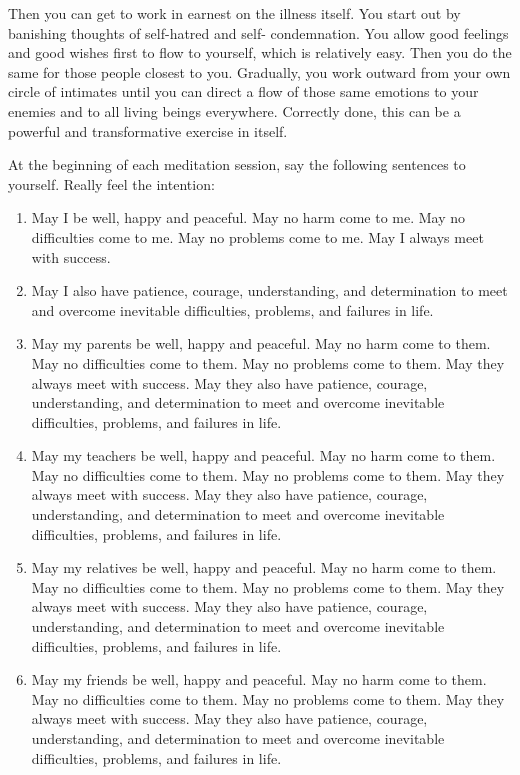 Then you can get to work in earnest on the illness itself.  You start out by
banishing thoughts of self-hatred and self- condemnation. You allow good
feelings and good wishes first to flow to yourself, which is relatively easy.
Then you do the same for those people closest to you. Gradually, you work
outward from your own circle of intimates until you can direct a flow of those
same emotions to your enemies and to all living beings everywhere. Correctly
done, this can be a powerful and transformative exercise in itself.

At the beginning of each meditation session, say the following sentences to
yourself. Really feel the intention: 

\begin{enumerate}
\item May I be well, happy and peaceful. May
no harm come to me. May no difficulties come to me. May no problems come to me.
May I always meet with success.

\item May I also have patience, courage, understanding, and determination to meet
and overcome inevitable difficulties, problems, and failures in life.

\item May my parents be well, happy and peaceful. May no harm come to them. May
no difficulties come to them. May no problems come to them. May they always meet
with success. May they also have patience, courage, understanding, and
determination to meet and overcome inevitable difficulties, problems, and
failures in life.

\item May my teachers be well, happy and peaceful. May no harm come to them. May no
difficulties come to them. May no problems come to them. May they always meet
with success. May they also have patience, courage, understanding, and
determination to meet and overcome inevitable difficulties, problems, and
failures in life.

\item May my relatives be well, happy and peaceful. May no harm come to them. May
no difficulties come to them. May no problems come to them. May they always meet
with success. May they also have patience, courage, understanding, and
determination to meet and overcome inevitable difficulties, problems, and
failures in life.

\item May my friends be well, happy and peaceful. May no harm come to them. May no
difficulties come to them. May no problems come to them. May they always meet
with success. May they also have patience, courage, understanding, and
determination to meet and overcome inevitable difficulties, problems, and
failures in life.


\end{enumerate}

